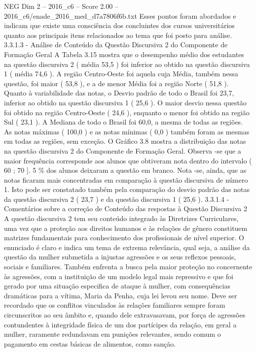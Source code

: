 \begin{textsample}{NEG Dim 2 – 2016\_c6 – Score 2.00 – 2016\_c6/enade\_2016\_med\_d7a7806f6b.txt}
Esses pontos foram abordados e indicam que existe uma consciência dos concluintes dos cursos universitários quanto aos principais itens relacionados ao tema que foi posto para análise. 3.3.1.3 - Análise de Conteúdo da Questão Discursiva 2 do Componente de Formação Geral A Tabela 3.15 mostra que o desempenho médio dos estudantes na questão discursiva 2 ( média 53,5 ) foi inferior ao obtido na questão discursiva 1 ( média 74,6 ).
A região Centro-Oeste foi aquela cuja Média, também nessa questão, foi maior ( 53,8 ), e a de menor Média foi a região Norte ( 51,8 ).
Quanto à variabilidade das notas, o Desvio padrão de todo o Brasil foi 23,7, inferior ao obtido na questão discursiva 1 ( 25,6 ).
O maior desvio nessa questão foi obtido na região Centro-Oeste ( 24,6 ), enquanto o menor foi obtido na região Sul ( 23,1 ).
A Mediana de todo o Brasil foi 60,0, a mesma de todas as regiões.
As notas máximas ( 100,0 ) e as notas mínimas ( 0,0 ) também foram as mesmas em todas as regiões, sem exceção.
O Gráfico 3.8 mostra a distribuição das notas na questão discursiva 2 do Componente de Formação Geral.
Observa -se que a maior frequência corresponde aos alunos que obtiveram nota dentro do intervalo ( 60 ; 70 ]. 5 \% dos alunos deixaram a questão em branco.
Nota -se, ainda, que as notas ficaram mais concentradas em comparação à questão discursiva de número 1.
Isto pode ser constatado também pela comparação do desvio padrão das notas da questão discursiva 2 ( 23,7 ) e da questão discursiva 1 ( 25,6 ). 3.3.1.4 - Comentários sobre a correção de Conteúdo das respostas à Questão Discursiva 2 A questão discursiva 2 tem seu conteúdo integrado às Diretrizes Curriculares, uma vez que a proteção aos direitos humanos e às relações de gênero constituem matrizes fundamentais para conhecimento dos profissionais de nível superior.
O enunciado é claro e indica um tema de extrema relevância, qual seja, a análise da questão da mulher submetida a injustas agressões e os seus reflexos pessoais, sociais e familiares.
Também enfrenta a busca pela maior proteção no concernente às agressões, com a instituição de um modelo legal mais repressivo e que foi gerado por uma situação especifica de ataque à mulher, com consequências dramáticas para a vítima, Maria da Penha, cuja lei levou seu nome.
Deve ser recordado que os conflitos vinculados às relações familiares sempre foram circunscritos ao seu âmbito e, quando dele extravasavam, por força de agressões contundentes à integridade física de um dos partícipes da relação, em geral a mulher, raramente redundavam em punições relevantes, sendo comum o pagamento em cestas básicas de alimentos, como sanção.

\end{textsample}
